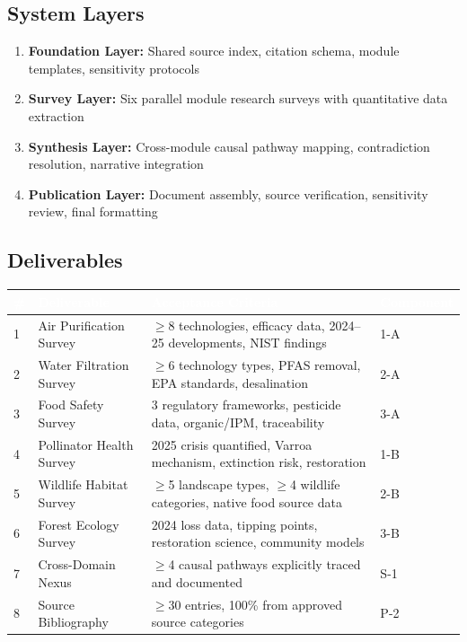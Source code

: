 \documentclass[11pt,letterpaper]{article}
\newcommand{\tableheader}[1]{\textbf{\sffamily\textcolor{white}{#1}}}
\begin{document}
\subsection{System Layers}

\begin{enumerate}[leftmargin=*]
  \item \textbf{Foundation Layer:} Shared source index, citation schema, module templates, sensitivity protocols
  \item \textbf{Survey Layer:} Six parallel module research surveys with quantitative data extraction
  \item \textbf{Synthesis Layer:} Cross-module causal pathway mapping, contradiction resolution, narrative integration
  \item \textbf{Publication Layer:} Document assembly, source verification, sensitivity review, final formatting
\end{enumerate}

\subsection{Deliverables}

\begin{center}
\begin{tabularx}{\textwidth}{C{0.6cm}L{3.5cm}XC{2cm}}
\toprule
{}
\tableheader{\#} & \tableheader{Deliverable} & \tableheader{Acceptance Criteria} & \tableheader{Component} \\
 & Air Purification Survey & $\geq$8 technologies, efficacy data, 2024--25 developments, NIST findings & 1-A \\
2 & Water Filtration Survey & $\geq$6 technology types, PFAS removal, EPA standards, desalination & 2-A \\
3 & Food Safety Survey & 3 regulatory frameworks, pesticide data, organic/IPM, traceability & 3-A \\
4 & Pollinator Health Survey & 2025 crisis quantified, Varroa mechanism, extinction risk, restoration & 1-B \\
5 & Wildlife Habitat Survey & $\geq$5 landscape types, $\geq$4 wildlife categories, native food source data & 2-B \\
6 & Forest Ecology Survey & 2024 loss data, tipping points, restoration science, community models & 3-B \\
7 & Cross-Domain Nexus & $\geq$4 causal pathways explicitly traced and documented & S-1 \\
8 & Source Bibliography & $\geq$30 entries, 100\% from approved source categories & P-2 \\
\bottomrule
\end{tabularx}
\end{center}
\end{document}
